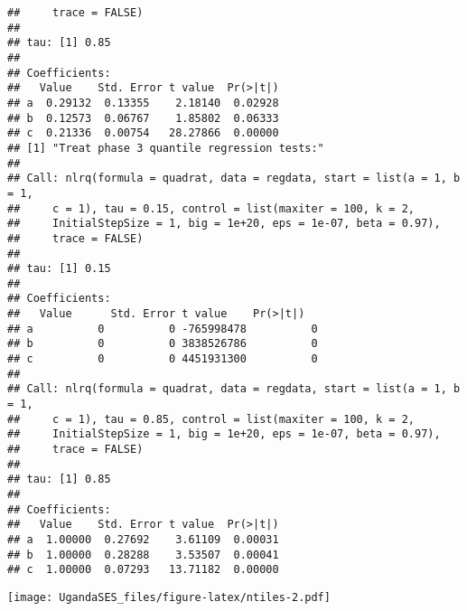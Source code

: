 \documentclass[
]{article}
\begin{document}
\begin{verbatim}
##     trace = FALSE)
## 
## tau: [1] 0.85
## 
## Coefficients:
##   Value    Std. Error t value  Pr(>|t|)
## a  0.29132  0.13355    2.18140  0.02928
## b  0.12573  0.06767    1.85802  0.06333
## c  0.21336  0.00754   28.27866  0.00000
## [1] "Treat phase 3 quantile regression tests:"
## 
## Call: nlrq(formula = quadrat, data = regdata, start = list(a = 1, b = 1, 
##     c = 1), tau = 0.15, control = list(maxiter = 100, k = 2, 
##     InitialStepSize = 1, big = 1e+20, eps = 1e-07, beta = 0.97), 
##     trace = FALSE)
## 
## tau: [1] 0.15
## 
## Coefficients:
##   Value      Std. Error t value    Pr(>|t|)  
## a          0          0 -765998478          0
## b          0          0 3838526786          0
## c          0          0 4451931300          0
## 
## Call: nlrq(formula = quadrat, data = regdata, start = list(a = 1, b = 1, 
##     c = 1), tau = 0.85, control = list(maxiter = 100, k = 2, 
##     InitialStepSize = 1, big = 1e+20, eps = 1e-07, beta = 0.97), 
##     trace = FALSE)
## 
## tau: [1] 0.85
## 
## Coefficients:
##   Value    Std. Error t value  Pr(>|t|)
## a  1.00000  0.27692    3.61109  0.00031
## b  1.00000  0.28288    3.53507  0.00041
## c  1.00000  0.07293   13.71182  0.00000
\end{verbatim}

\texttt{[image: UgandaSES\_files/figure-latex/ntiles-2.pdf]}
\end{document}
